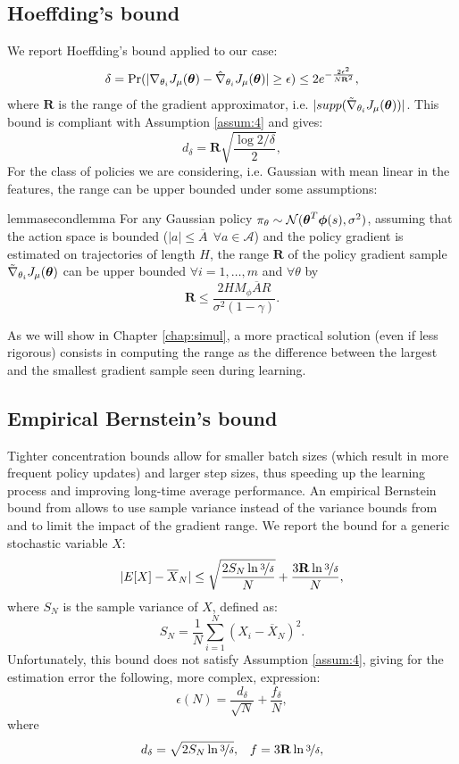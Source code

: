 \subsection{Hoeffding's bound}
We report Hoeffding's bound applied to our case:
\[
	\delta = \Pr(|\nabla_{\theta_i}J_\mu(\boldsymbol{\theta}) - \hat{\nabla}_{\theta_i}J_{\mu}(\boldsymbol{\theta})| \geq \epsilon)
		 \leq 2e^{-\frac{2\epsilon^2}{N\mathbf{R}^2}},
\]
where $\mathbf{R}$ is the range of the gradient approximator, i.e. $|supp(\tilde{\nabla}_{\theta_i}J_{\mu}(\boldsymbol{\theta}))|$.
This bound is compliant with Assumption \ref{assum:4} and gives:
\[
d_\delta = \mathbf{R}\sqrt{\frac{\log{2/\delta}}{2}},
\]
For the class of policies we are considering, i.e. Gaussian with mean linear in the features, the range can be upper bounded under some assumptions:

\begin{restatable}{lemma}{secondlemma}
For any Gaussian policy $\pi_\theta \sim \mathcal{N}(\boldsymbol{\theta}^T\boldsymbol{\phi}(s),\sigma^2)$, assuming that the action space is bounded ($|a|\leq \overline{A}\:\:\forall a \in \mathcal{A}$) and the policy gradient is estimated on trajectories of length $H$, the range $\mathbf{R}$ of the policy gradient sample $\tilde{\nabla}_{\theta_i}J_{\mu}(\boldsymbol{\theta})$ can be upper bounded $\forall i=1,\dots,m$ and $\forall \theta$ by
\[
\mathbf{R} \leq \frac{2HM_{\phi}\overline{A}R}{\sigma^2(1-\gamma)}.
\]
\end{restatable}

As we will show in Chapter \ref{chap:simul}, a more practical solution (even if less rigorous) consists in computing the range as the difference between the largest and the smallest gradient sample seen during learning.

\subsection{Empirical Bernstein's bound}
Tighter concentration bounds allow for smaller batch sizes (which result in more frequent policy updates) and larger step sizes, thus speeding up the learning process and improving long-time average performance. An empirical Bernstein bound from \cite{Mnih:2008:EBS:1390156.1390241} allows to use sample variance instead of the variance bounds from \cite{DBLP:journals/nn/ZhaoHNS12} and to limit the impact of the gradient range. We report the bound for a generic stochastic variable $X$:
\[
	|E[X] - \overline{X}_N| \leq  \sqrt{\frac{2S_N\ln{\nicefrac{3}{\delta}}}{N}}
		+ \frac{3\mathbf{R}\ln{\nicefrac{3}{\delta}}}{N},
\]
where $S_N$ is the sample variance of $X$, defined as:
\[
	S_N = \frac{1}{N}\sum\limits_{i=1}^N(X_i - \overline{X}_N)^2.
\]
Unfortunately, this bound does not satisfy Assumption \ref{assum:4}, giving for the estimation error the following, more complex, expression:
 \[
 \epsilon(N) = \frac{d_\delta}{\sqrt{N}} + \frac{f_\delta}{N},
\]
where
\begin{align*}
d_\delta= \sqrt{2S_N\ln{\nicefrac{3}{\delta}}}, && f=3\mathbf{R}\ln{\nicefrac{3}{\delta}},
\end{align*}

